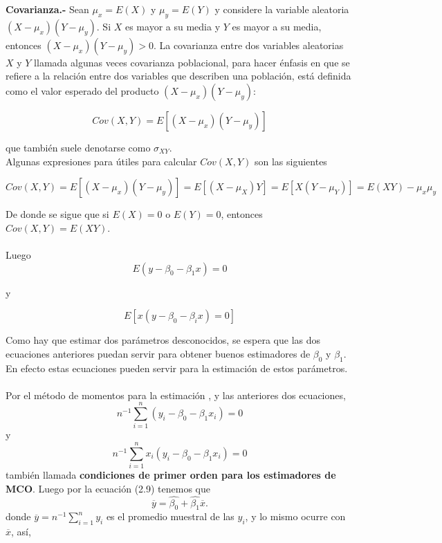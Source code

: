 \textbf{Covarianza.-} Sean $\mu_x = E(X)$ y $\mu_y = E(Y)$ y considere la variable aleatoria $(X-\mu_x)(Y-\mu_y)$. Si $X$ es mayor a su media y $Y$ es mayor a su media, entonces $(X-\mu_x)(Y-\mu_y)>0$. La covarianza entre dos variables aleatorias $X$ y $Y$ llamada algunas veces covarianza poblacional, para hacer énfasis en que se refiere a la relación entre dos variables que describen una población, está definida como el valor esperado del producto $(X-\mu_x)(Y-\mu_y)$: 

\begin{equation}
    Cov(X,Y) = E\left[(X-\mu_x)(Y-\mu_y)\right]
\end{equation}

que también suele denotarse como $\sigma_{XY}.$  \\
Algunas expresiones para útiles para calcular $Cov(X,Y)$ son las siguientes

\begin{equation}
    Cov(X,Y) = E\left[(X-\mu_x)(Y-\mu_y)\right] = E\left[(X-\mu_X)Y\right] = E\left[X(Y-\mu_Y)\right] = E(XY) - \mu_x \mu_y
\end{equation}

De donde se sigue que si $E(X)=0$ o $E(Y)=0$, entonces $Cov(X,Y) = E(XY)$.\\\\

Luego  
\begin{equation}
    E(y - \beta_0 - \beta_1x) = 0
\end{equation}
 
y 

\begin{equation}
    E\left[x(y - \beta_0 -\beta_i x )= 0\right]
\end{equation}

Como hay que estimar dos parámetros desconocidos, se espera que las dos ecuaciones anteriores puedan servir para obtener buenos estimadores de $\beta_0$ y $\beta_1$. En efecto estas ecuaciones pueden servir para la estimación de estos parámetros.\\\\

Por el método de momentos para la estimación , y las anteriores dos ecuaciones,
\begin{equation}
    n^{-1} \sum\limits_{i=1}^n (y_i - \beta_0 - \beta_1x_i) = 0
\end{equation}
y 
\begin{equation}
    n^{-1} \sum\limits_{i=1}^n x_i(y_i - \beta_0 - \beta_1x_i) = 0
\end{equation}
también llamada \textbf{condiciones de primer orden para los estimadores de MCO}. Luego por la ecuación (2.9) tenemos que 
\begin{equation}
    \overline{y} = \hat{\beta_0} + \hat{\beta_1}\overline{x}.
\end{equation}
donde $\overline{y} = n^{-1}\sum\limits_{i=1}^n y_i$ es el promedio muestral de las $y_i$, y lo mismo ocurre con $\overline{x}$, así, 

